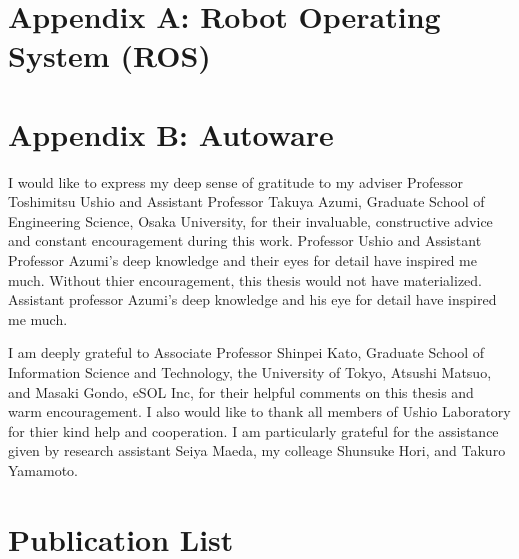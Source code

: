 \documentclass[a4j,12pt,oneside,openany,english]{jsbook}
\begin{document}
\chapter*{Appendix A: Robot Operating System (ROS)}



\setcounter{chapter}{2}
\setcounter{section}{0}
\setcounter{figure}{0}

\chapter*{Appendix B: Autoware}





\begin{acknowledgement}
  I would like to express my deep sense of gratitude to my adviser Professor Toshimitsu Ushio and Assistant Professor Takuya Azumi, Graduate School of Engineering Science, Osaka University, for their invaluable, constructive advice and constant encouragement during this work.
  Professor Ushio and Assistant Professor Azumi's deep knowledge and their eyes for detail have inspired me much.
  Without thier encouragement, this thesis would not have materialized.
  Assistant professor Azumi's deep knowledge and his eye for detail have inspired me much.

  I am deeply grateful to Associate Professor Shinpei Kato, Graduate School of Information Science and Technology, the University of Tokyo, Atsushi Matsuo, and Masaki Gondo, eSOL Inc, for their helpful comments on this thesis and warm encouragement.
  I also would like to thank all members of Ushio Laboratory for thier kind help and cooperation.
  I am particularly grateful for the assistance given by research assistant Seiya Maeda, my colleage Shunsuke Hori, and Takuro Yamamoto.
\end{acknowledgement}







\chapter*{Publication List}
\end{document}
